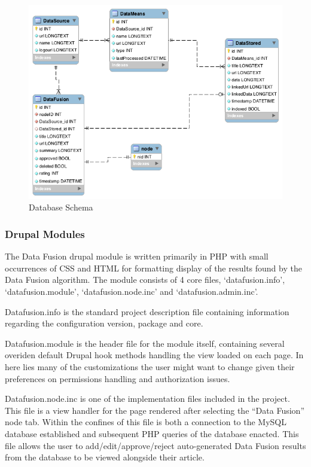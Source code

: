 \documentclass[10pt]{article} %
\begin{document}
\begin{figure}[htbp]
\begin{center}
\includegraphics[width=\columnwidth]{images/database_schema}
\caption{Database Schema}
\end{center}
\end{figure}

\subsubsection{Drupal Modules}

The Data Fusion drupal module is written primarily in PHP with small occurrences of CSS and HTML for formatting display of the results found by the Data Fusion algorithm. The module consists of 4 core files, ‘datafusion.info’,  ‘datafusion.module’, ‘datafusion.node.inc’ and ‘datafusion.admin.inc’.

Datafusion.info is the standard project description file containing information regarding the configuration version, package and core.

Datafusion.module is the header file for the module itself, containing several overiden default Drupal hook methods handling the view loaded on each page. In here lies many of the customizations the user might want to change given their preferences on permissions handling and authorization issues.

Datafusion.node.inc is one of the implementation files included in the project.  This file is a view handler for the page rendered after selecting the “Data Fusion” node tab. Within the confines of this file is both a connection to the MySQL database established and subsequent PHP queries of the database enacted. This file allows the user to add/edit/approve/reject auto-generated Data Fusion results from the database to be viewed alongside their article.
\end{document}
